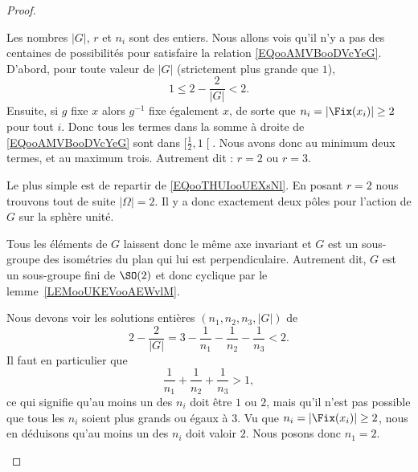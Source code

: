 \begin{proof}
\begin{subproof}
            Les nombres \( | G |\), \( r\) et \( n_i\) sont des entiers. Nous allons vois qu'il n'y a pas des centaines de possibilités pour satisfaire la relation \eqref{EQooAMVBooDVcYeG}. D'abord, pour toute valeur de \( | G |\) (strictement plus grande que \( 1\)),
            \begin{equation}
                1\leq 2-\frac{ 2 }{ | G | }<2.
            \end{equation}
            Ensuite, si \( g\) fixe \( x\) alors \( g^{-1}\) fixe également \( x\), de sorte que \( n_i=| \Fix(x_i) |\geq 2\) pour tout \( i\). Donc tous les termes dans la somme à droite de \eqref{EQooAMVBooDVcYeG} sont dans \( \mathopen[ \frac{ 1 }{2} , 1 \mathclose[\). Nous avons donc au minimum deux termes, et au maximum trois. Autrement dit : \( r=2\) ou \( r=3\).

            \item[Si \( r=2\)]

                Le plus simple est de repartir de \eqref{EQooTHUIooUEXsNl}. En posant \( r=2\) nous trouvons tout de suite \( | \Omega |=2\). Il y a donc exactement deux pôles pour l'action de \( G\) sur la sphère unité.

                Tous les éléments de \( G\) laissent donc le même axe invariant et \( G\) est un sous-groupe des isométries du plan qui lui est perpendiculaire. Autrement dit, \( G\) est un sous-groupe fini de \( \SO(2)\) et donc cyclique par le lemme~\ref{LEMooUKEVooAEWvlM}.

            \item[Les possibilités pour \( r=3\)]

                Nous devons voir les solutions entières \( (n_1,n_2,n_3,| G |)\) de
                \begin{equation}
                    2-\frac{ 2 }{ | G | }=3-\frac{1}{ n_1 }-\frac{1}{ n_2 }-\frac{1}{ n_3 }<2.
                \end{equation}
                Il faut en particulier que
                \begin{equation}
                    \frac{1}{ n_1 }+\frac{1}{ n_2 }+\frac{1}{ n_3 }>1,
                \end{equation}
                ce qui signifie qu'au moins un des \( n_i\) doit être \( 1\) ou \( 2\), mais qu'il n'est pas possible que tous les \( n_i\) soient plus grands ou égaux à \( 3\). Vu que \( n_i=| \Fix(x_i) |\geq 2\), nous en déduisons qu'au moins un des \( n_i\) doit valoir \( 2\). Nous posons donc \( n_1=2\).


\end{subproof}
\end{proof}
